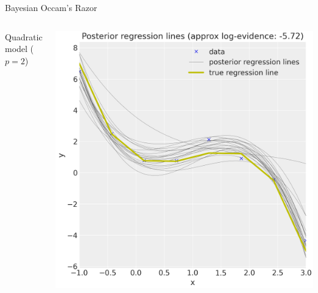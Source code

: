 \documentclass[10pt]{beamer}
\begin{document}
\begin{frame}{Bayesian Occam's Razor}
\begin{columns}
\begin{column}{0.33\textwidth}
            Quadratic model ($p=2$)
        \end{column}
        \begin{column}{0.33\textwidth}
            \includegraphics[width=\columnwidth]{images/bayesian_regression_cubic_model}%
            

\end{column}
\end{columns}
\end{frame}
\end{document}
